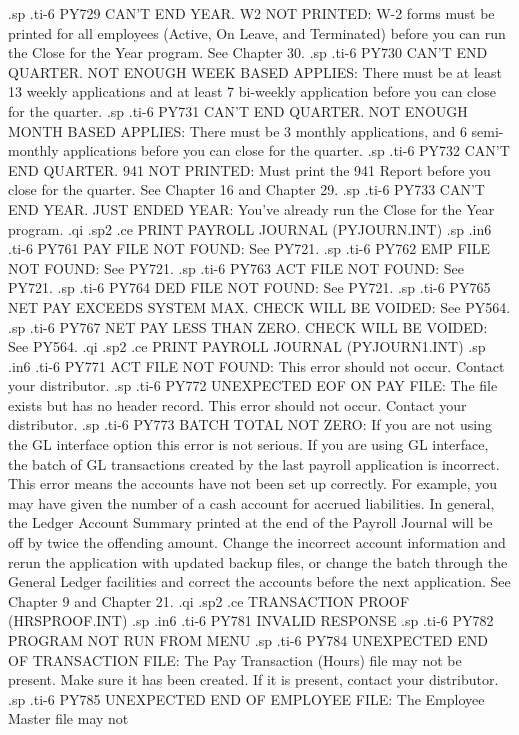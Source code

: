 .sp
.ti-6
PY729 CAN'T END YEAR.  W2 NOT PRINTED:  W-2 forms must be printed
for all employees (Active, On Leave, and Terminated) before you can
run the Close for the Year program.  See Chapter 30.
.sp
.ti-6
PY730 CAN'T END QUARTER.  NOT ENOUGH WEEK BASED APPLIES:  There must
be at least 13 weekly applications and at least 7 bi-weekly application before
you can close for the quarter.
.sp
.ti-6
PY731 CAN'T END QUARTER.  NOT ENOUGH MONTH BASED APPLIES: There must
be 3 monthly applications, and 6 semi-monthly applications before
you can close for the quarter.
.sp
.ti-6
PY732 CAN'T END QUARTER.  941 NOT PRINTED: Must print the 941 Report
before you close for the quarter.  See Chapter 16 and Chapter 29.
.sp
.ti-6
PY733 CAN'T END YEAR.  JUST ENDED YEAR:  You've already run the Close
for the Year program.
.qi
.sp2
.ce
PRINT PAYROLL JOURNAL (PYJOURN.INT)
.sp
.in6
.ti-6
PY761 PAY FILE NOT FOUND: See PY721.
.sp
.ti-6
PY762 EMP FILE NOT FOUND: See PY721.
.sp
.ti-6
PY763 ACT FILE NOT FOUND: See PY721.
.sp
.ti-6
PY764 DED FILE NOT FOUND: See PY721.
.sp
.ti-6
PY765 NET PAY EXCEEDS SYSTEM MAX. CHECK WILL BE VOIDED: See PY564.
.sp
.ti-6
PY767 NET PAY LESS THAN ZERO. CHECK WILL BE VOIDED: See PY564.
.qi
.sp2
.ce
PRINT PAYROLL JOURNAL (PYJOURN1.INT)
.sp
.in6
.ti-6
PY771 ACT FILE NOT FOUND: This error should not occur.	Contact your
distributor.
.sp
.ti-6
PY772 UNEXPECTED EOF ON PAY FILE: The file exists but has no header record.
This error should not occur. Contact your distributor.
.sp
.ti-6
PY773 BATCH TOTAL NOT ZERO: If you are not using the GL interface option
this error is not serious.  If you are using GL interface, the batch of
GL transactions
created by the last payroll application is incorrect.  This error means
the accounts have not been set up correctly. For example, you may
have given the number of a cash account for accrued liabilities.  In general,
the Ledger Account Summary printed at the end of the Payroll Journal will
be off by twice the offending amount.  Change the incorrect account information
and rerun the application with updated
backup files, or change the batch through the General Ledger facilities and
correct the accounts before the next application.  See Chapter 9 and Chapter
21.
.qi
.sp2
.ce
TRANSACTION PROOF (HRSPROOF.INT)
.sp
.in6
.ti-6
PY781 INVALID RESPONSE
.sp
.ti-6
PY782 PROGRAM NOT RUN FROM MENU
.sp
.ti-6
PY784 UNEXPECTED END OF TRANSACTION FILE: The Pay Transaction (Hours) file
may not be present.  Make sure it has been created.  If it is present,
contact your distributor.
.sp
.ti-6
PY785 UNEXPECTED END OF EMPLOYEE FILE:	The Employee Master file may not
